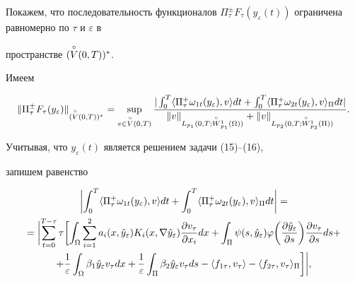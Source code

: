 Покажем, что последовательность функционалов $\Pi^{\pm}_\tau F_\tau 


(y_\varepsilon(t))$ ограничена равномерно по $\tau$ и $\varepsilon$ в 


пространстве $(\overset{\circ} V(0,T))^*$. 





Имеем 


\begin{equation*} 


\|\Pi^{\pm}_\tau F_\tau(y_\varepsilon)\|_{(\oc V(0,T))^*} =  


\sup_{v\in \oc V(0,T)} 


\frac{|\int^T_0\langle\Pi^{+}_\tau \omega_{1t}(y_\varepsilon),v\rangle dt+ 


\int^T_0\langle\Pi^{+}_\tau \omega_{2t}(y_\varepsilon),v\rangle_\Pi dt |} 


{\|v\|_{L_{p_1}(0,T;\oc W{}^1_{p_1}(\Omega))}+ 


\|v\|_{L_{p_2}(0,T;\oc W{}^1_{p_2}(\Pi))}}.


\end{equation*} 


Учитывая, что $y_\varepsilon(t)$ является решением задачи (15)--(16), 


запишем равенство 


\begin{gather*} 


\biggl |\int^T_0\langle\Pi^+_\tau \omega_{1t}(y_\varepsilon),v\rangle dt+


\int^T_0\langle\Pi^+_\tau\omega_{2t}(y_\varepsilon),v\rangle_\Pi dt 


\biggr | =\\ 


=\biggl |\sum^{T-\tau}_{t=0}\tau \biggl [ \int_\Omega \sum^2_{i=1} 


a_i(x,\Hat y_\varepsilon)K_i(x,\nabla \Hat y_\varepsilon) 


\frac{\partial v_\tau}{\partial x_i}dx + \int_\Pi 


\psi(s,\Hat y_\varepsilon)\varphi\biggl(\frac{\partial \Hat y_\varepsilon}


{\partial s}\biggr)\frac{\partial v_\tau}{\partial s}ds + \\ 


+\frac{1}{\varepsilon}\int_\Omega \beta_1\Hat y_\varepsilon v_\tau dx+ 


\frac{1}{\varepsilon}\int_\Pi \beta_2\Hat y_\varepsilon v_\tau ds - 


\langle f_{1\tau},v_\tau\rangle - \langle f_{2\tau},v_\tau\rangle_\Pi \biggr ] \biggr |, 


\end{gather*} 



